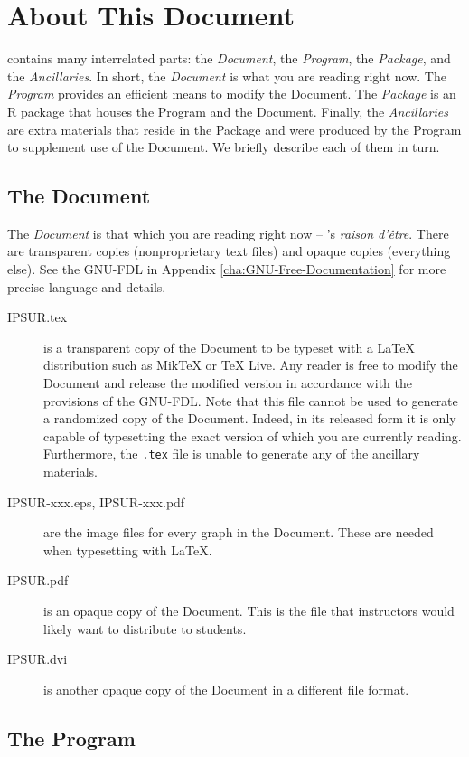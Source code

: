 \documentclass[captions=tableheading]{scrbook}
\begin{document}
\section*{About This Document}

\IPSUR contains many interrelated parts: the \emph{Document}, the \emph{Program}, the \emph{Package}, and the \emph{Ancillaries}. In short, the \emph{Document} is what you are reading right now. The \emph{Program} provides an efficient means to modify the Document. The \emph{Package} is an \textsf{R} package that houses the Program and the Document. Finally, the \emph{Ancillaries} are extra materials that reside in the Package and were produced by the Program to supplement use of the Document. We briefly describe each of them in turn.

\subsection*{The Document}

The \emph{Document} is that which you are reading right now -- \IPSUR's \emph{raison d'\^etre}. There are transparent copies (nonproprietary text files) and opaque copies (everything else). See the GNU-FDL in Appendix \ref{cha:GNU-Free-Documentation} for more precise language and details.


\begin{description}
\item[IPSUR.tex] is a transparent copy of the Document to be typeset with a \LaTeX{} distribution such as Mik\TeX{} or \TeX{} Live. Any reader is free to modify the Document and release the modified version in accordance with the provisions of the GNU-FDL. Note that this file cannot be used to generate a randomized copy of the Document. Indeed, in its released form it is only capable of typesetting the exact version of \IPSUR which you are currently reading. Furthermore, the \texttt{.tex} file is unable to generate any of the ancillary materials.
\item[IPSUR-xxx.eps, IPSUR-xxx.pdf] are the image files for every graph in the Document. These are needed when typesetting with \LaTeX{}.
\item[IPSUR.pdf] is an opaque copy of the Document. This is the file that instructors would likely want to distribute to students.
\item[IPSUR.dvi] is another opaque copy of the Document in a different file format.
\end{description}

\subsection*{The Program}
\end{document}
